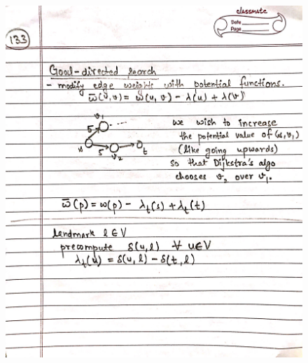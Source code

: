 \begin{figure}[H]
    \centering
    \includegraphics[width=16cm, height=21cm]{"./MIT-6.006/MIT-6006-133"}
\end{figure}
